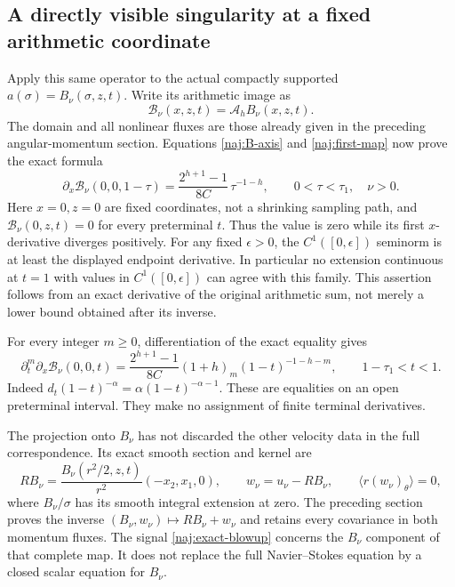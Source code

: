 \subsection{A directly visible singularity at a fixed arithmetic coordinate}

Apply this same operator to the actual compactly supported
\(a(\sigma)=B_\nu(\sigma,z,t)\). Write its arithmetic image as
\[
 \mathcal B_\nu(x,z,t)=\mathcal A_hB_\nu(x,z,t).
\]
The domain and all nonlinear fluxes are those already given in the
preceding angular-momentum section. Equations \eqref{naj:B-axis} and
\eqref{naj:first-map} now prove the exact formula
\begin{equation}\label{naj:exact-blowup}
 \boxed{\displaystyle
 \partial_x\mathcal B_\nu(0,0,1-\tau)
    =\frac{2^{h+1}-1}{8C}\,\tau^{-1-h},
       \qquad 0<\tau<\tau_1,\quad \nu>0 .}
\end{equation}
Here \(x=0,z=0\) are fixed coordinates, not a shrinking sampling path,
and \(\mathcal B_\nu(0,z,t)=0\) for every preterminal \(t\).
Thus the value is zero while its first \(x\)-derivative diverges
positively. For any fixed \(\epsilon>0\), the \(C^1([0,\epsilon])\)
seminorm is at least the displayed endpoint derivative. In particular
no extension continuous at \(t=1\) with values in
\(C^1([0,\epsilon])\) can agree with this family.
This assertion follows from an exact derivative of the original
arithmetic sum, not merely a lower bound obtained after its inverse.

For every integer \(m\ge0\), differentiation of the exact equality gives
\[
 \partial_t^m\partial_x\mathcal B_\nu(0,0,t)
  =\frac{2^{h+1}-1}{8C}(1+h)_m(1-t)^{-1-h-m},
 \qquad 1-\tau_1<t<1 .
\]
Indeed \(d_t(1-t)^{-\alpha}=\alpha(1-t)^{-\alpha-1}\).
These are equalities on an open preterminal interval. They make no
assignment of finite terminal derivatives.

The projection onto \(B_\nu\) has not discarded the other velocity
data in the full correspondence. Its exact smooth section and kernel
are
\[
 R B_\nu=\frac{B_\nu(r^2/2,z,t)}{r^2}(-x_2,x_1,0),\qquad
 w_\nu=u_\nu-RB_\nu,\qquad \langle r(w_\nu)_\theta\rangle=0,
\]
where \(B_\nu/\sigma\) has its smooth integral extension at zero.
The preceding section proves the inverse
\((B_\nu,w_\nu)\mapsto RB_\nu+w_\nu\) and retains every covariance
in both momentum fluxes. The signal \eqref{naj:exact-blowup} concerns
the \(B_\nu\) component of that complete map. It does not replace the
full Navier--Stokes equation by a closed scalar equation for \(B_\nu\).

